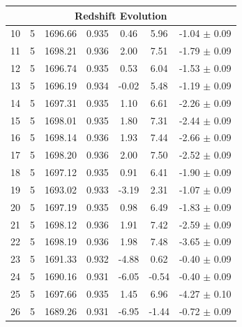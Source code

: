 \begin{longtable}{c c c c c c c}
    \hline
    \multicolumn{7}{c}{\textbf{Redshift Evolution}} \\
    \hline
    10 & 5 & 1696.66 & 0.935 & 0.46 & \cellcolor{aicorange}5.96 & \cellcolor{aicorange}-1.04 $\pm$ 0.09 \\
    11 & 5 & 1698.21 & 0.936 & \cellcolor{aiclightorange}2.00 & \cellcolor{aiclightred}7.51 & \cellcolor{aicorange}-1.79 $\pm$ 0.09 \\
    12 & 5 & 1696.74 & 0.935 & 0.53 & \cellcolor{aiclightred}6.04 & \cellcolor{aicorange}-1.53 $\pm$ 0.09 \\
    13 & 5 & 1696.19 & 0.934 & -0.02 & \cellcolor{aicorange}5.48 & \cellcolor{aicorange}-1.19 $\pm$ 0.09 \\
    14 & 5 & 1697.31 & 0.935 & 1.10 & \cellcolor{aiclightred}6.61 & \cellcolor{aicorange}-2.26 $\pm$ 0.09 \\
    15 & 5 & 1698.01 & 0.935 & 1.80 & \cellcolor{aiclightred}7.31 & \cellcolor{aicorange}-2.44 $\pm$ 0.09 \\
    16 & 5 & 1698.14 & 0.936 & 1.93 & \cellcolor{aiclightred}7.44 & \cellcolor{aicorange}-2.66 $\pm$ 0.09 \\
    17 & 5 & 1698.20 & 0.936 & 2.00 & \cellcolor{aiclightred}7.50 & \cellcolor{aicorange}-2.52 $\pm$ 0.09 \\
    18 & 5 & 1697.12 & 0.935 & 0.91 & \cellcolor{aiclightred}6.41 & \cellcolor{aicorange}-1.90 $\pm$ 0.09 \\
    19 & 5 & 1693.02 & 0.933 & \cellcolor{aiclightyellow}-3.19 & \cellcolor{aiclightorange}2.31 & \cellcolor{aicorange}-1.07 $\pm$ 0.09 \\
    20 & 5 & 1697.19 & 0.935 & 0.98 & \cellcolor{aiclightred}6.49 & \cellcolor{aicorange}-1.83 $\pm$ 0.09 \\
    21 & 5 & 1698.12 & 0.936 & 1.91 & \cellcolor{aiclightred}7.42 & \cellcolor{aicorange}-2.59 $\pm$ 0.09 \\
    22 & 5 & 1698.19 & 0.936 & 1.98 & \cellcolor{aiclightred}7.48 & \cellcolor{aiclightred}-3.65 $\pm$ 0.09 \\
    23 & 5 & 1691.33 & 0.932 & \cellcolor{aicyellow}-4.88 & 0.62 & -0.40 $\pm$ 0.09 \\
    24 & 5 & 1690.16 & 0.931 & \cellcolor{aicyellow}-6.05 & -0.54 & -0.40 $\pm$ 0.09 \\
    25 & 5 & 1697.66 & 0.935 & 1.45 & \cellcolor{aiclightred}6.96 & \cellcolor{aiclightred}-4.27 $\pm$ 0.10 \\
    26 & 5 & 1689.26 & 0.931 & \cellcolor{aicyellow}-6.95 & -1.44 & -0.72 $\pm$ 0.09 \\

\end{longtable}
